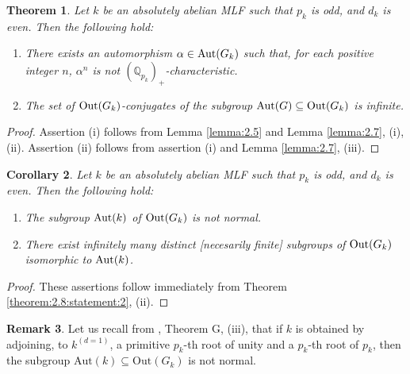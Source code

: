 \documentclass[11pt,showkeys]{article}
\theoremstyle{theorem}
\newtheorem{theorem}{Theorem}[section]
\newtheorem{corollary}[theorem]{Corollary}
\theoremstyle{definition}
\newtheorem{remark}[theorem]{Remark}
\def\bQ{{\mathbb Q}}
\begin{document}
\begin{theorem}\label{theorem:2.8}
Let $k$ be an absolutely abelian MLF such that $p_k$ is odd, and $d_k$ is even. Then the following hold: 
\begin{enumerate}[label=(\roman*),ref=(\roman*)]
\item[\rm (i)] There exists an automorphism $\alpha \in {\rm Aut}(G_k)$ such that, for each positive integer $n$, $\alpha^n$ is not $(\bQ_{p_k})_+$-characteristic. \label{theorem:2.8:statement:1} 
    \item[\rm (ii)] The set of ${\rm Out}(G_k)$-conjugates of the subgroup ${\rm Aut}(G) \subseteq {\rm Out}(G_k)$ is infinite. \label{theorem:2.8:statement:2}  
\end{enumerate}
\end{theorem}

\begin{proof}
Assertion (i) follows from Lemma \ref{lemma:2.5} and Lemma \ref{lemma:2.7}, (i), (ii). 
Assertion (ii) follows from assertion (i) and Lemma \ref{lemma:2.7}, (iii). 
\end{proof}

\begin{corollary}\label{corollary:2.9}
Let $k$ be an absolutely abelian MLF such that $p_k$ is odd, and $d_k$ is even. Then the following hold: 
   \begin{enumerate}[label=(\arabic*),ref=(\arabic*)]
   	\item[\rm (i)] The subgroup ${\rm Aut}(k)$ of ${\rm Out}(G_k)$ is not normal. \label{colloraly:2.9:statement:1}
   	\item[\rm (ii)] There exist infinitely many distinct [necesarily finite] subgroups of ${\rm Out}(G_k)$ isomorphic to ${\rm Aut}(k)$.  \label{corollary:2.9:statement:2}   
   \end{enumerate}
\end{corollary}
\begin{proof}
These assertions follow immediately from Theorem \ref{theorem:2.8:statement:2}, (ii). 
\end{proof}

\begin{remark}\label{remark:2.10}
Let us recall from \cite{Hoshi2}, Theorem G, (iii), that 
if $k$ is obtained by adjoining, to $k^{(d=1)}$, a 
primitive $p_k$-th root of unity and a $p_k$-th root of 
$p_k$, then the subgroup $\mathrm{Aut}(k) \subseteq 
\mathrm{Out}(G_k)$ is not normal. 
\end{remark}
\end{document}
